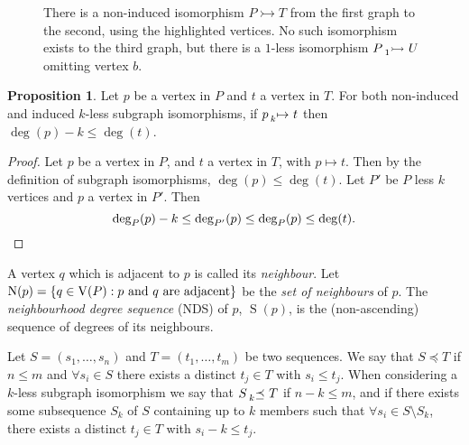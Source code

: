 \documentclass[letterpaper]{article}
\theoremstyle{definition}
\newtheorem{proposition}{Proposition}
\newcommand{\lessnonind}[1]{\prescript{}{#1}{\rightarrowtail}\ }
\newcommand{\lessmap}[1]{\prescript{}{#1}{\mapsto}\ }
\newcommand{\lesspreceq}[1]{\prescript{}{#1}{\preceq}\ }
\newcommand{\V}{\operatorname{V}}
\newcommand{\N}{\operatorname{N}}
\newcommand{\nds}{\operatorname{S}}
\begin{document}
\begin{figure}[t]
    \caption{There is a non-induced isomorphism $P\rightarrowtail T$ from the first graph to the
    second, using the highlighted vertices. No such isomorphism exists to the third graph, but there
    is a $1$-less isomorphism $P\lessnonind{1} U$ omitting vertex $b$.}\label{figure:klessexample}
\end{figure}

\begin{proposition}\label{prop:deg}
    Let $p$ be a vertex in $P$ and $t$ a vertex in $T$. For both non-induced and induced
    $k$-less subgraph isomorphisms, if $p \lessmap{k} t$ then
    $\deg(p) - k \le \deg(t)$.
\end{proposition}
\begin{proof}
Let $p$ be a vertex in $P$, and $t$ a vertex in $T$, with $p\mapsto t$. Then by the definition of subgraph isomorphisms, $\deg(p) \le \deg(t)$. Let $P'$ be $P$ less $k$ vertices and $p$ a vertex in $P'$. Then
\[
\deg_{P}(p)-k \le \deg_{P'}(p) \le \deg_{P}(p) \le \deg(t). \qedhere
\]
\end{proof}

A vertex $q$ which is adjacent to $p$ is called its \emph{neighbour}.  Let $\N(p) = \{ q \in \V(P) :
 p~\textnormal{and}~q~\textnormal{are adjacent}\}$ be the \emph{set of neighbours} of $p$.  The \emph{neighbourhood
degree sequence} (NDS) of $p$, $\nds(p)$, is the (non-ascending) sequence of degrees of its
neighbours.

Let $S = ( s_1 , \ldots , s_n )$ and $T = ( t_1 , \ldots , t_m)$ be two sequences.  We say that $S
\preceq T$ if $n \leq m$ and $\forall s_i \in S$ there exists a distinct $t_j \in T$ with $s_i \leq
t_j$.  When considering a $k$-less subgraph isomorphism we say that $S \lesspreceq{k} T$ if $n - k
\leq m$, and if there exists some subsequence $S_k$ of $S$ containing up to $k$ members such that
$\forall s_i \in S \setminus S_k$, there exists a distinct $t_j \in T$ with $s_i - k \leq t_j$.
\end{document}
